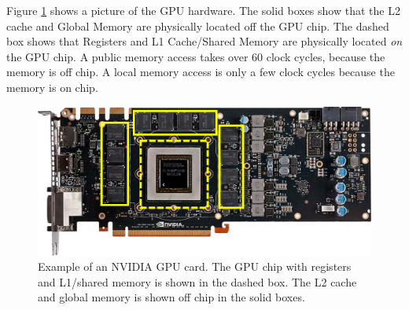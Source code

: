 Figure \ref{fig:GPUarch} shows a picture of the GPU hardware.
The solid boxes show that the L2 cache and Global Memory are physically located off the GPU chip. 
The dashed box shows that Registers and L1 Cache/Shared Memory are physically located \textit{on} the GPU chip. 
A public memory access takes over 60 clock cycles, because the memory is off chip. 
A local memory access is only a few clock cycles because the memory is on chip.
\begin{figure}
	\centering\includegraphics[width=\textwidth]{figures/gpu_intro/Kepler_box.png}
	\caption{Example of an NVIDIA GPU card. The GPU chip with registers and L1/shared memory is shown in the dashed box.	The L2 cache and global memory is shown off chip in the solid boxes.}
	\label{fig:GPUarch}
\end{figure}

